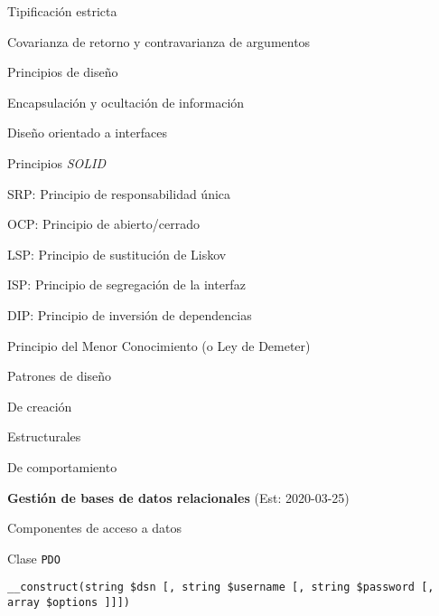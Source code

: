 \begin{longenum}
\begin{longenum}
\begin{longenum}
            \item Tipificación estricta
            \item Covarianza de retorno y contravarianza de argumentos
        \end{longenum}
        \item Principios de diseño
        \begin{longenum}
            \item Encapsulación y ocultación de información
            \item Diseño orientado a interfaces
            \item Principios \textit{SOLID}
            \begin{longenum}
                \item SRP: Principio de responsabilidad única
                \item OCP: Principio de abierto/cerrado
                \item LSP: Principio de sustitución de Liskov
                \item ISP: Principio de segregación de la interfaz
                \item DIP: Principio de inversión de dependencias
            \end{longenum}
            \item Principio del Menor Conocimiento (o Ley de Demeter)
        \end{longenum}
        \item Patrones de diseño
        \begin{longenum}
            \item De creación
            \item Estructurales
            \item De comportamiento
        \end{longenum}
    \end{longenum}
    \item \textbf{Gestión de bases de datos relacionales}  (Est: 2020-03-25)
    \begin{longenum}
        \item Componentes de acceso a datos
        \begin{longenum}
            \item Clase \texttt{PDO}
            \begin{longenum}
                \item \texttt{\_\_construct(string \$dsn [, string \$username [, string \$password [, array \$options ]]])}

\end{longenum}
\end{longenum}
\end{longenum}
\end{longenum}
